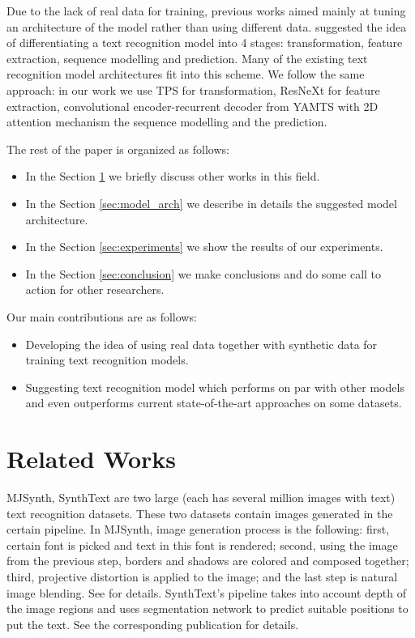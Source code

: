 \documentclass[runningheads]{llncs}
\begin{document}
Due to the lack of real data for training, previous works aimed mainly at tuning an architecture
of the model rather than using different data. \cite{baek2019STRcomparisons} suggested the
idea of differentiating a text recognition model into 4 stages: transformation, feature
extraction, sequence modelling and prediction. Many of the existing text recognition model
architectures fit into this scheme. We follow the same approach: in our work we
use TPS \cite{tpsstn} for transformation, ResNeXt \cite{ResNeXt} for feature
extraction, convolutional encoder-recurrent decoder from YAMTS \cite{krylov2021open}
with 2D attention mechanism the sequence modelling and the prediction.

The rest of the paper is organized as follows:
\begin{itemize}
  \item In the Section \ref{sec:rel_works} we briefly discuss other works in this field.
  \item In the Section \ref{sec:model_arch} we describe in details the suggested model architecture.
  \item In the Section \ref{sec:experiments} we show the results of our experiments.
  \item In the Section \ref{sec:conclusion} we make conclusions and do some call to action for other
        researchers.
\end{itemize}

Our main contributions are as follows:
\begin{itemize}
  \item Developing the idea of using real data together with synthetic data for training text recognition models.
  \item Suggesting text recognition model which performs on par with other models and
        even outperforms current state-of-the-art approaches on some datasets.
\end{itemize}


\section{Related Works}
\label{sec:rel_works}

MJSynth\cite{Jaderberg14c}, SynthText\cite{Gupta16} are two large (each has several
million images with text) text recognition datasets. These two datasets contain images
generated in the certain pipeline. In MJSynth, image generation process is the following:
first, certain font is picked and text in this font is rendered; second, using the image from the
previous step, borders and shadows are colored and composed together; third, projective
distortion is applied to the image; and the last step is natural image blending. See
\cite{Jaderberg14c} for details. SynthText's pipeline takes into account depth of the image
regions and uses segmentation network to predict suitable positions to put the text.
See the corresponding publication \cite{Gupta16} for details.
\end{document}
